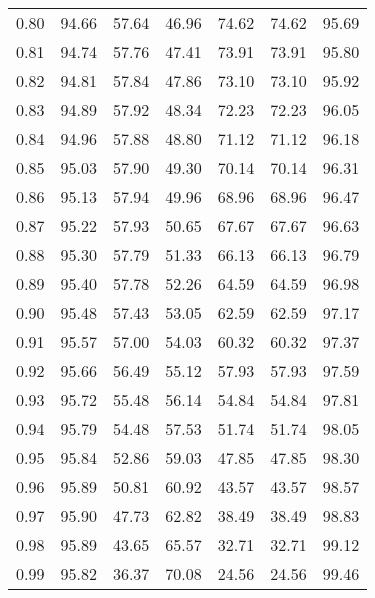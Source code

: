\begin{tabular}{|c|c|c|c|c|c|c|}
      0.80 &     94.66 &     57.64 &      46.96 &   74.62 &      74.62 &         95.69 \\
      0.81 &     94.74 &     57.76 &      47.41 &   73.91 &      73.91 &         95.80 \\
      0.82 &     94.81 &     57.84 &      47.86 &   73.10 &      73.10 &         95.92 \\
      0.83 &     94.89 &     57.92 &      48.34 &   72.23 &      72.23 &         96.05 \\
      0.84 &     94.96 &     57.88 &      48.80 &   71.12 &      71.12 &         96.18 \\
      0.85 &     95.03 &     57.90 &      49.30 &   70.14 &      70.14 &         96.31 \\
      0.86 &     95.13 &     57.94 &      49.96 &   68.96 &      68.96 &         96.47 \\
      0.87 &     95.22 &     57.93 &      50.65 &   67.67 &      67.67 &         96.63 \\
      0.88 &     95.30 &     57.79 &      51.33 &   66.13 &      66.13 &         96.79 \\
      0.89 &     95.40 &     57.78 &      52.26 &   64.59 &      64.59 &         96.98 \\
      0.90 &     95.48 &     57.43 &      53.05 &   62.59 &      62.59 &         97.17 \\
      0.91 &     95.57 &     57.00 &      54.03 &   60.32 &      60.32 &         97.37 \\
      0.92 &     95.66 &     56.49 &      55.12 &   57.93 &      57.93 &         97.59 \\
      0.93 &     95.72 &     55.48 &      56.14 &   54.84 &      54.84 &         97.81 \\
      0.94 &     95.79 &     54.48 &      57.53 &   51.74 &      51.74 &         98.05 \\
      0.95 &     95.84 &     52.86 &      59.03 &   47.85 &      47.85 &         98.30 \\
      0.96 &     95.89 &     50.81 &      60.92 &   43.57 &      43.57 &         98.57 \\
      0.97 &     95.90 &     47.73 &      62.82 &   38.49 &      38.49 &         98.83 \\
      0.98 &     95.89 &     43.65 &      65.57 &   32.71 &      32.71 &         99.12 \\
      0.99 &     95.82 &     36.37 &      70.08 &   24.56 &      24.56 &         99.46 \\
\bottomrule
\end{tabular}
